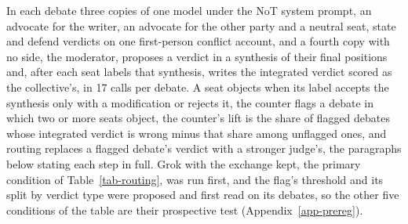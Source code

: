 In each debate three copies of one model under the NoT system prompt, an
advocate for the writer, an advocate for the other party and a neutral seat,
state and defend verdicts on one first-person conflict account, and a fourth
copy with no side, the moderator, proposes a verdict in a synthesis of their
final positions and, after each seat labels that synthesis, writes the
integrated verdict scored as the collective's, in 17 calls per debate. A
seat objects when its label accepts the synthesis only with a modification
or rejects it, the counter flags a debate in which two or more seats object,
the counter's lift is the share of flagged debates whose integrated verdict
is wrong minus that share among unflagged ones, and routing replaces a
flagged debate's verdict with a stronger judge's, the paragraphs below
stating each step in full. Grok with the exchange kept, the primary
condition of Table~\ref{tab-routing}, was run first, and the flag's
threshold and its split by verdict type were proposed and first read on its
debates, so the other five conditions of the table are their prospective
test (Appendix~\ref{app-prereg}).

